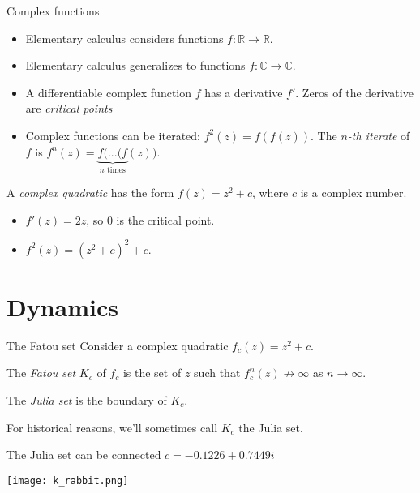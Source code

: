 \documentclass{beamer}
\begin{document}
\begin{frame}{Complex functions}
    \begin{itemize}
        \item Elementary calculus considers functions $f:\mathbb{R}\rightarrow\mathbb{R}$.
        \item Elementary calculus generalizes to functions $f:\mathbb{C}\rightarrow\mathbb{C}$.
        \item A differentiable complex function $f$ has a derivative $f'$. Zeros of the derivative are \emph{critical points}
        \item Complex functions can be iterated: $f^2(z)=f(f(z))$. The \emph{$n$-th iterate} of $f$ is $f^n(z)=\underbrace{f(...(f}_{n\text{ times}}(z))$.
    \end{itemize}
    \begin{example}
        A \emph{complex quadratic} has the form $f(z)=z^2+c$, where $c$ is a complex number.
        \begin{itemize}
            \item $f'(z)=2z$, so $0$ is the critical point.
            \item $f^2(z)=(z^2+c)^2+c$.
        \end{itemize}
    \end{example}
\end{frame}

\section{Dynamics}

\begin{frame}{The Fatou set}
Consider a complex quadratic $f_c(z)=z^2+c$.
\begin{definition}
The \emph{Fatou set} $K_c$ of $f_c$ is the set of $z$ such that $f_c^n(z)\not\rightarrow\infty$ as $n\rightarrow\infty$.
\end{definition}
\begin{definition}
The \emph{Julia set} is the boundary of $K_c$.
\end{definition}
For historical reasons, we'll sometimes call $K_c$ the Julia set.
\end{frame}

\begin{frame}{The Julia set can be connected}
\centering
$c=-0.1226+0.7449i$

\texttt{[image: k\_rabbit.png]}
\end{frame}
\end{document}
